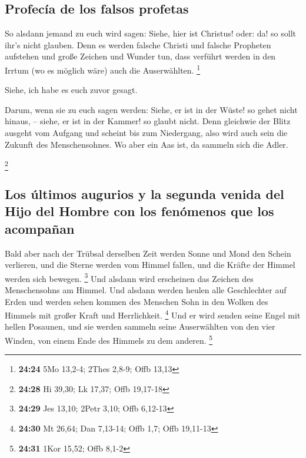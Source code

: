 \hypertarget{profecuxeda-de-los-falsos-profetas}{%
\subsection{Profecía de los falsos
profetas}\label{profecuxeda-de-los-falsos-profetas}}

 So alsdann jemand zu euch wird sagen: Siehe, hier ist
Christus! oder: da! so sollt ihr's nicht glauben.  Denn
es werden falsche Christi und falsche Propheten aufstehen und große
Zeichen und Wunder tun, dass verführt werden in den Irrtum (wo es
möglich wäre) auch die Auserwählten. \footnote{\textbf{24:24} 5Mo
  13,2-4; 2Thes 2,8-9; Offb 13,13}

 Siehe, ich habe es euch zuvor gesagt.

 Darum, wenn sie zu euch sagen werden: Siehe, er ist in
der Wüste! so gehet nicht hinaus, -- siehe, er ist in der Kammer! so
glaubt nicht.  Denn gleichwie der Blitz ausgeht vom
Aufgang und scheint bis zum Niedergang, also wird auch sein die Zukunft
des Menschensohnes.  Wo aber ein Aas ist, da sammeln sich
die Adler.

\footnote{\textbf{24:28} Hi 39,30; Lk 17,37; Offb 19,17-18}

\hypertarget{los-uxfaltimos-augurios-y-la-segunda-venida-del-hijo-del-hombre-con-los-fenuxf3menos-que-los-acompauxf1an}{%
\subsection{Los últimos augurios y la segunda venida del Hijo del Hombre
con los fenómenos que los
acompañan}\label{los-uxfaltimos-augurios-y-la-segunda-venida-del-hijo-del-hombre-con-los-fenuxf3menos-que-los-acompauxf1an}}

 Bald aber nach der Trübsal derselben Zeit werden Sonne
und Mond den Schein verlieren, und die Sterne werden vom Himmel fallen,
und die Kräfte der Himmel werden sich bewegen. \footnote{\textbf{24:29}
  Jes 13,10; 2Petr 3,10; Offb 6,12-13}  Und alsdann wird
erscheinen das Zeichen des Menschensohns am Himmel. Und alsdann werden
heulen alle Geschlechter auf Erden und werden sehen kommen des Menschen
Sohn in den Wolken des Himmels mit großer Kraft und Herrlichkeit.
\footnote{\textbf{24:30} Mt 26,64; Dan 7,13-14; Offb 1,7; Offb 19,11-13}
 Und er wird senden seine Engel mit hellen Posaunen, und
sie werden sammeln seine Auserwählten von den vier Winden, von einem
Ende des Himmels zu dem anderen. \footnote{\textbf{24:31} 1Kor 15,52;
  Offb 8,1-2}

